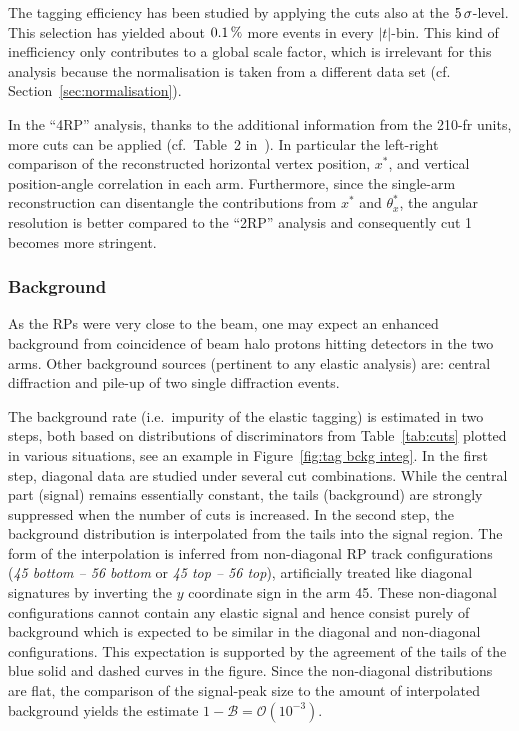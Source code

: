 The tagging efficiency has been studied by applying the cuts also at the $5\,{\rm \sigma}$-level. This selection has yielded about $0.1\,{\rm \%}$ more events in every $|t|$-bin. This kind of inefficiency only contributes to a global scale factor, which is irrelevant for this analysis because the normalisation is taken from a different data set (cf. Section~\ref{sec:normalisation}).

In the ``4RP'' analysis, thanks to the additional information from the 210-fr units, more cuts can be applied (cf.~Table~2 in~\cite{epl101-el}). In particular the left-right comparison of the reconstructed horizontal vertex position, $x^*$, and vertical position-angle correlation in each arm. Furthermore, since the single-arm reconstruction can disentangle the contributions from $x^*$ and $\theta^*_x$, the angular resolution is better compared to the ``2RP'' analysis and consequently cut 1 becomes more stringent.






\subsubsection{Background}
\label{sec:background}

As the RPs were very close to the beam, one may expect an enhanced background from coincidence of beam halo protons hitting detectors in the two arms. Other background sources (pertinent to any elastic analysis) are: central diffraction and pile-up of two single diffraction events.

The background rate (i.e.~impurity of the elastic tagging) is estimated in two steps, both based on distributions of discriminators from Table~\ref{tab:cuts} plotted in various situations, see an example in Figure~\ref{fig:tag bckg integ}. In the first step, diagonal data are studied under several cut combinations. While the central part (signal) remains essentially constant, the tails (background) are strongly suppressed when the number of cuts is increased. In the second step, the background distribution is interpolated from the tails into the signal region. The form of the interpolation is inferred from non-diagonal RP track configurations (\textit{45 bottom -- 56 bottom} or \textit{45 top -- 56 top}), artificially treated like diagonal signatures by inverting the $y$ coordinate sign in the arm 45. These non-diagonal configurations cannot contain any elastic signal and hence consist purely of background which is expected to be similar in the diagonal and non-diagonal configurations. This expectation is supported by the agreement of the tails of the blue solid and dashed curves in the figure. Since the non-diagonal distributions are flat, the comparison of the signal-peak size to the amount of interpolated background yields the estimate $1 - \mathcal{B} = \mathcal{O}(10^{-3})$.

